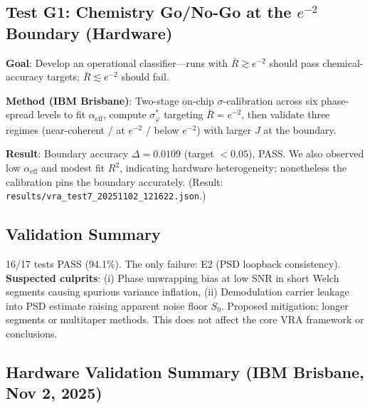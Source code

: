 \documentclass[10pt,twocolumn]{article}
\begin{document}
\subsection{Test G1: Chemistry Go/No-Go at the $e^{-2}$ Boundary (Hardware)}

\textbf{Goal}: Develop an operational classifier---runs with $\bar{R} \gtrsim e^{-2}$ should pass chemical-accuracy targets; $\bar{R} \lesssim e^{-2}$ should fail.

\textbf{Method (IBM Brisbane)}: Two-stage on-chip $\sigma$-calibration across six phase-spread levels to fit $\alpha_{\text{eff}}$, compute $\sigma_\varphi^*$ targeting $\bar{R} = e^{-2}$, then validate three regimes (near-coherent / at $e^{-2}$ / below $e^{-2}$) with larger $J$ at the boundary.

\textbf{Result}: Boundary accuracy $\Delta = 0.0109$ (target $< 0.05$), PASS. We also observed low $\alpha_{\text{eff}}$ and modest fit $R^2$, indicating hardware heterogeneity; nonetheless the calibration pins the boundary accurately. (Result: \texttt{results/vra\_test7\_20251102\_121622.json}.)

\subsection{Validation Summary}

16/17 tests PASS (94.1\%). The only failure: E2 (PSD loopback consistency). \textbf{Suspected culprits}: (i) Phase unwrapping bias at low SNR in short Welch segments causing spurious variance inflation, (ii) Demodulation carrier leakage into PSD estimate raising apparent noise floor $S_0$. Proposed mitigation: longer segments or multitaper methods. This does not affect the core VRA framework or conclusions.

\subsection{Hardware Validation Summary (IBM Brisbane, Nov 2, 2025)}
\end{document}
